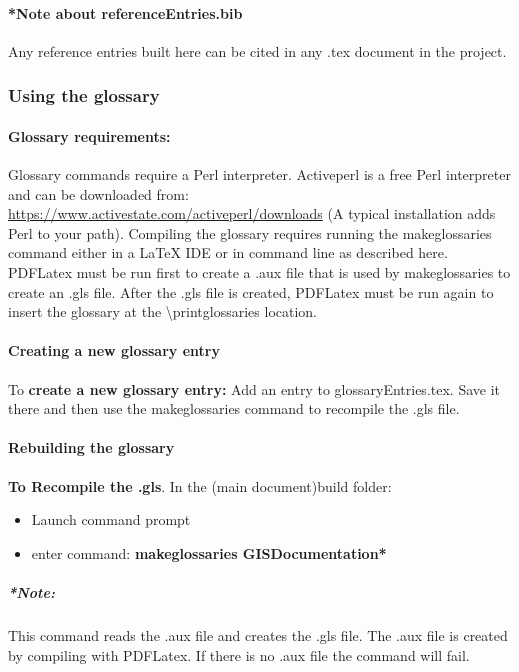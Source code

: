 \documentclass[class=book , crop=false]{standalone}
\begin{document}
\paragraph*{*Note about referenceEntries.bib}
{\footnotesize Any reference entries built here can be cited in any .tex document in the project.}

\subsubsection[Using the glossary]{{\Large Using the glossary}}
\paragraph{Glossary requirements:}
Glossary commands require a Perl interpreter.  Activeperl is a free Perl interpreter and can be downloaded from:\\ \href{https://www.activestate.com/activeperl/downloads}{https://www.activestate.com/activeperl/downloads}
{\tiny (A typical installation adds Perl to your path)}.  Compiling the glossary requires running the makeglossaries command either in a \LaTeX{} IDE or in command line as described here.  PDFLatex must be run first to create a .aux file that is used by makeglossaries to create an .gls file.  After the .gls file is created, PDFLatex must be run again to insert the glossary at the \textbackslash printglossaries location.
\paragraph{Creating a new glossary entry}
To \textbf{create a new glossary entry:} Add an entry to glossaryEntries.tex.  Save it there and then use the makeglossaries command to recompile the .gls file.
\paragraph{Rebuilding the glossary}
\textbf{To Recompile the .gls}.  In the (main document)build folder:
\begin{itemize}
\item Launch command prompt
\item enter command: \textbf{{\large makeglossaries GISDocumentation*}}
\end{itemize}
\subparagraph{*Note:} {\footnotesize This command reads the .aux file and creates the .gls file.  The .aux file is created by compiling with PDFLatex.  If there is no .aux file the command will fail.}
\end{document}
